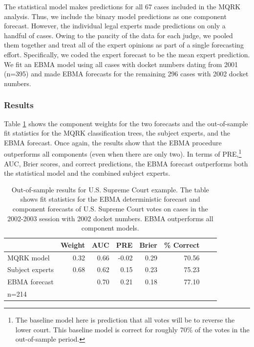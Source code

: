 \documentclass[pdftex,12pt,fullpage,oneside]{amsart}
\begin{document}
The statistical model makes predictions for all 67 cases included in
the MQRK analysis.  Thus, we include the binary model predictions as
one component forecast. However, the individual legal experts made
predictions on only a handful of cases. Owing to the paucity of the
data for each judge, we pooled them together and treat all of the
expert opinions as part of a single forecasting effort.  Specifically,
we coded the expert forecast to be the mean expert prediction. We fit
an EBMA model using all cases with docket numbers dating from 2001
(n=395) and made EBMA forecasts for the remaining 296 cases with 2002
docket numbers.

 \subsubsection{Results}

 Table \ref{SC-Res} shows the component weights for the two forecasts
 and the out-of-sample fit statistics for the MQRK classification
 trees, the subject experts, and the EBMA forecast. Once again, the
 results show that the EBMA procedure outperforms all components (even
 when there are only two).  In terms of PRE,\footnote{The baseline model
   here is prediction that all votes will be to reverse the lower
   court.  This baseline model is correct for roughly 70\% of the
   votes in the out-of-sample period.} AUC, Brier scores, and correct
 predictions, the EBMA forecast outperforms both the statistical model
 and the combined subject experts. 

\begin{table}[ht]
\vspace{-5pt}
  \caption{\footnotesize Out-of-sample results for U.S. Supreme Court
    example.  The table shows fit statistics for the EBMA deterministic
    forecast and component forecasts of U.S. Supreme Court votes on
    cases in the 2002-2003 session with 2002 docket numbers.   EBMA
    outperforms all component models. }
\label{SC-Res} \small
\begin{center}
\begin{tabular}{lrrrrrrr}
\toprule
 & Weight & AUC & PRE & Brier & \% Correct   \\ 
\midrule
MQRK model& 0.32  & 0.66 & -0.02 & 0.29 & 70.56   \\ 
Subject experts & 0.68 & 0.62 & 0.15 & 0.23 & 75.23  \\ 
EBMA forecast&  & 0.70 & 0.21 & 0.18 & 77.10  \\ 
\bottomrule
n=214 
\end{tabular}
\end{center}
\vspace{-15pt}
\end{table}
\end{document}
